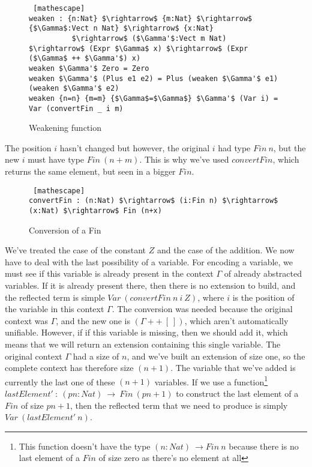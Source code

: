  \begin{figure}[H]
\figrule
\begin{center}
\begin{lstlisting} [mathescape]
weaken : {n:Nat} $\rightarrow$ {m:Nat} $\rightarrow$ {$\Gamma$:Vect n Nat} $\rightarrow$ {x:Nat} 
          $\rightarrow$ ($\Gamma'$:Vect m Nat) $\rightarrow$ (Expr $\Gamma$ x) $\rightarrow$ (Expr ($\Gamma$ ++ $\Gamma'$) x)
weaken $\Gamma'$ Zero = Zero
weaken $\Gamma'$ (Plus e1 e2) = Plus (weaken $\Gamma'$ e1) (weaken $\Gamma'$ e2)
weaken {n=n} {m=m} {$\Gamma$=$\Gamma$} $\Gamma'$ (Var i) = Var (convertFin _ i m)    
\end{lstlisting}
\end{center}
\caption{Weakening function}
\label{weaken}
\figrule
\end{figure}


The position $i$ hasn't changed but however, the original $i$ had type $Fin\ n$, but the new $i$ must have type $Fin\ (n+m)$. This is why we've used $convertFin$, which returns the same element, but seen in a bigger $Fin$.

 \begin{figure}[H]
\figrule
\begin{center}
\begin{lstlisting} [mathescape]
convertFin : (n:Nat) $\rightarrow$ (i:Fin n) $\rightarrow$ (x:Nat) $\rightarrow$ Fin (n+x)
\end{lstlisting}
\end{center}
\caption{Conversion of a Fin}
\label{convertFin}
\figrule
\end{figure}

We've treated the case of the constant $Z$ and the case of the addition. We now have to deal with the last possibility of a variable. For encoding a variable, we must see if this variable is already present in the context $\Gamma$ of already abstracted variables. If it is already present there, then there is no extension to build, and the reflected term is simple $Var\ (convertFin\ n\ i\ Z)$, where $i$ is the position of the variable in this context $\Gamma$. The conversion was needed because the original context was $\Gamma$, and the new one is $(\Gamma ++\ [\ ])$, which aren't automatically unifiable. However, if if this variable is missing, then we should add it, which means that we will return an extension containing this single variable. The original context $\Gamma$ had a size of $n$, and we've built an extension of size one, so the complete context has therefore size $(n+1)$. The variable that we've added is currently the last one of these  $(n+1)$ variables. If we use a function\footnote{This function doesn't have the type $(n:Nat)\ \rightarrow Fin\ n$ because there is no last element of a $Fin$ of size zero as there's no element at all}  $lastElement'\ :\ (pn:Nat)\ \rightarrow\ Fin\ (pn+1)$ to construct the last element of a $Fin$ of size $pn+1$, then the reflected term that we need to produce is simply $Var\ (lastElement'\ n)$. 

